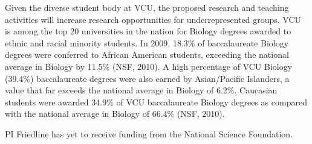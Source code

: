Given the diverse student body at VCU, the proposed research and 
teaching activities will increase research opportunities for underrepresented groups. VCU is among the top 20 universities in the 
nation for Biology degrees awarded to ethnic and racial minority students. In 2009, 18.3\% of baccalaureate Biology degrees were 
conferred to African American students, exceeding the national average in Biology by 11.5\% (NSF, 2010). A high percentage of 
VCU Biology (39.4\%) baccalaureate degrees were also earned by Asian/Pacific Islanders, a value that far exceeds the 
national average in Biology of 6.2\%. Caucasian students were awarded 34.9\% of VCU baccalaureate Biology degrees as 
compared with the national average in Biology of 66.4\% (NSF, 2010).




PI Friedline has yet to receive funding from the National Science Foundation.
